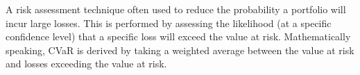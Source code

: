 A risk assessment technique often used to reduce the probability a portfolio will incur large losses. 
This is performed by assessing the likelihood (at a specific confidence level) that a specific loss will exceed the value at risk. 
Mathematically speaking, CVaR is derived by taking a weighted average between the value at risk and losses exceeding the value 
at risk. 

